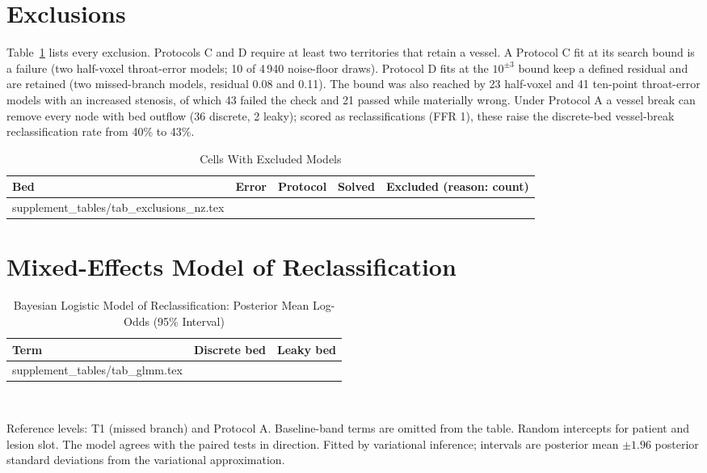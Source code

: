 \documentclass[journal,twoside,web,onecolumn]{ieeecolor}
\begin{document}
\FloatBarrier
{}
\section{Exclusions}
Table~\ref{tab:excl} lists every exclusion. Protocols C and D require at least two territories that retain a
vessel. A Protocol C fit at its search bound is a failure (two half-voxel throat-error models; 10 of 4\,940
noise-floor draws). Protocol D fits at the $10^{\pm 3}$ bound keep a defined residual and are retained (two missed-branch models, residual 0.08 and 0.11). The bound was also reached by 23 half-voxel and 41 ten-point throat-error models with an increased stenosis, of
which 43 failed the check and 21 passed while materially wrong.
Under Protocol A a vessel break can remove every node with bed outflow (36 discrete, 2 leaky); scored as reclassifications (FFR 1),
these raise the discrete-bed vessel-break reclassification rate from 40\% to 43\%.
\begin{table}[!ht]
\caption{Cells With Excluded Models}\label{tab:excl}
\centering\footnotesize
\begin{tabular}{@{}lllrl@{}}
\toprule
Bed & Error & Protocol & Solved & Excluded (reason: count)\\
\midrule
{} supplement_tables/tab_exclusions_nz.tex 
\bottomrule
\end{tabular}
\end{table}

\FloatBarrier
{}
\section{Mixed-Effects Model of Reclassification}
\begin{table}[!ht]
\caption{Bayesian Logistic Model of Reclassification: Posterior Mean Log-Odds (95\% Interval)}\label{tab:glmm}
\centering\footnotesize
\begin{tabular}{@{}lcc@{}}
\toprule
Term & Discrete bed & Leaky bed\\
\midrule
{} supplement_tables/tab_glmm.tex 
\bottomrule
\end{tabular}
\\[3pt]
\parbox{0.85\textwidth}{\footnotesize Reference levels: T1 (missed branch) and Protocol A. Baseline-band terms are
omitted from the table. Random intercepts for patient and lesion slot. The model agrees with the paired tests in direction. Fitted by variational inference; intervals are
posterior mean $\pm 1.96$ posterior standard deviations from the variational approximation.}
\end{table}
\end{document}
